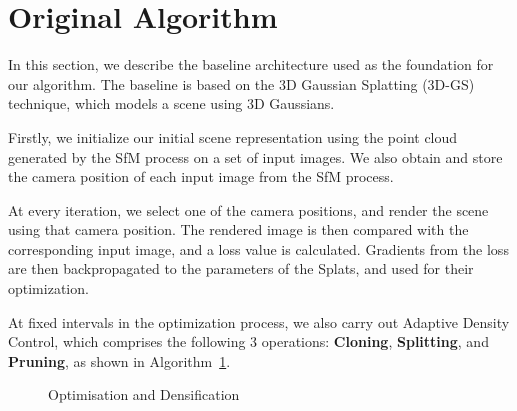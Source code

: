 \documentclass[11pt]{report}
\begin{document}
\section{Original Algorithm}



In this section, we describe the baseline architecture used as the foundation for our algorithm. The baseline is based on the 3D Gaussian Splatting (3D-GS) technique, which models a scene using 3D Gaussians. 

Firstly, we initialize our initial scene representation using the point cloud generated by the SfM process on a set of input images. We also obtain and store the camera position of each input image from the SfM process.

At every iteration, we select one of the camera positions, and render the scene using that camera position. The rendered image is then compared with the corresponding input image, and a loss value is calculated. Gradients from the loss are then backpropagated to the parameters of the Splats, and used for their optimization.

At fixed intervals in the optimization process, we also carry out Adaptive Density Control, which comprises the following 3 operations: \textbf{Cloning}, \textbf{Splitting}, and \textbf{Pruning}, as shown in Algorithm~\ref{alg:original_algorithm}.

\begin{figure}[ht]%
    \centering
    \begin{minipage}{0.75\textwidth}

            \begin{algorithm}[H]
                
                \caption{Optimisation and Densification}
                \label{alg:original_algorithm} 
            \end{algorithm}
    \end{minipage}
\end{figure}
\end{document}
